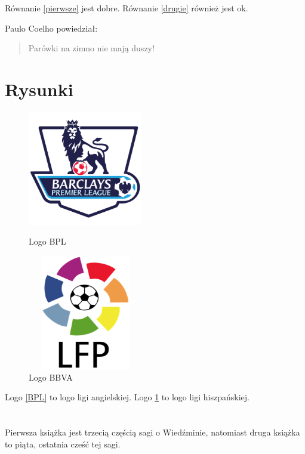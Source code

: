 \documentclass[12pt]{article}
\begin{document}
Równanie \ref{pierwsze} jest dobre.
Równanie \ref{drugie} również jest ok.


\vspace{5mm}
Paulo Coelho powiedział:
\begin{quote}
 Parówki na zimno nie mają duszy!
\end{quote}


\newpage

\section{Rysunki}
\begin{figure}[ht]
\begin{center}
\includegraphics[width=5cm,height=5cm,keepaspectratio]{BPLlogo.png}
\caption{Logo BPL}
\label{BPL}

\includegraphics[width=5cm,height=5cm,keepaspectratio]{BBVAlogo.png}
\caption{Logo BBVA}
\label{BBVA}
\end{center}
\end{figure}

Logo \ref{BPL} to logo ligi angielskiej.
Logo \ref{BBVA} to logo ligi hiszpańskiej.
\section*{}
Pierwsza książka \cite{saga3} jest trzecią częścią sagi o Wiedźminie, natomiast druga książka \cite{saga5} to piąta, ostatnia cześć tej sagi.

\newpage
\end{document}
